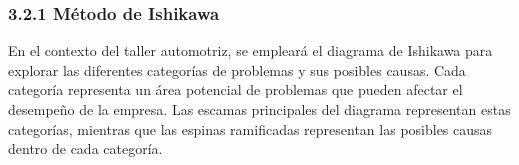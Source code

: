\subsubsection*{3.2.1 Método de Ishikawa}
En el contexto del taller automotriz, se empleará el diagrama de Ishikawa para explorar las diferentes categorías de problemas y sus posibles causas. Cada categoría representa un área potencial de problemas que pueden afectar el desempeño de la empresa. Las escamas principales del diagrama representan estas categorías, mientras que las espinas ramificadas representan las posibles causas dentro de cada categoría.

